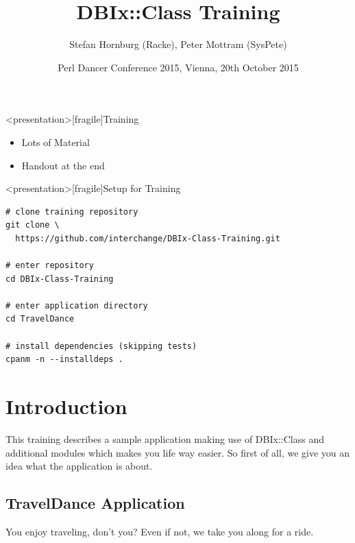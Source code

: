 \title{DBIx::Class Training}
\author{Stefan Hornburg (Racke), Peter Mottram (SysPete)}
\date{Perl Dancer Conference 2015, Vienna, 20th October 2015}


\maketitle



\begin{frame}
  \titlepage
\end{frame}

\begin{frame}<presentation>[fragile]{Training}
\begin{itemize}
\item Lots of Material
\item Handout at the end
\end{itemize}
\end{frame}

\begin{frame}<presentation>[fragile]{Setup for Training}
\begin{lstlisting}
# clone training repository
git clone \
  https://github.com/interchange/DBIx-Class-Training.git

# enter repository
cd DBIx-Class-Training

# enter application directory
cd TravelDance

# install dependencies (skipping tests)
cpanm -n --installdeps .
\end{lstlisting}
\end{frame}

\cleardoublepage

\tableofcontents

\cleardoublepage

\section{Introduction}

This training describes a sample application making use of
DBIx::Class and additional modules which makes you life
way easier. So first of all, we give you an idea what
the application is about.

\subsection{TravelDance Application}

You enjoy traveling, don't you? Even if not, we take you
along for a ride.

